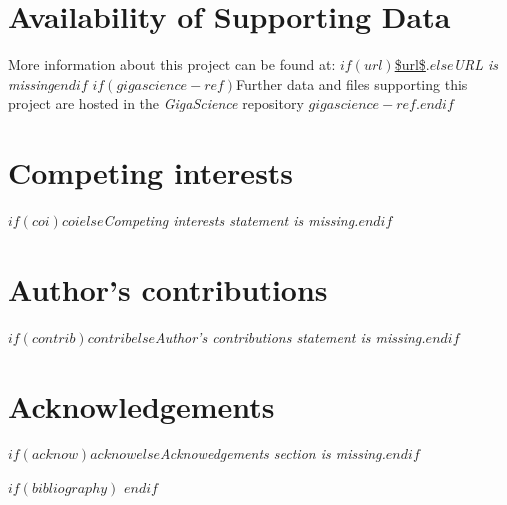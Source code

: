 \documentclass[10pt,a4paper,onecolumn]{bmcart}%
\begin{document}
\begin{backmatter}

\section*{Availability of Supporting Data}
More information about this project can be found at: $if(url)$\url{$url$}.$else$\emph{URL is missing}$endif$ $if(gigascience-ref)$Further data and files supporting this project are hosted in the \emph{GigaScience} repository $gigascience-ref$.$endif$

\section*{Competing interests}
$if(coi)$$coi$$else$\emph{Competing interests statement is missing.}$endif$

\section*{Author's contributions}
$if(contrib)$$contrib$$else$\emph{Author's contributions statement is missing.}$endif$

\section*{Acknowledgements}
$if(acknow)$$acknow$$else$\emph{Acknowedgements section is missing.}$endif$

  
  

$if(bibliography)$
$endif$

\end{backmatter}
\end{document}
